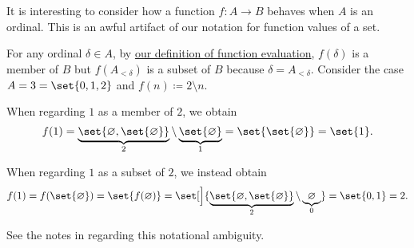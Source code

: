 \begin{remark}\label{rem:function_on_ordinal}
  It is interesting to consider how a function \( f: A \to B \) behaves when \( A \) is an ordinal. This is an awful artifact of our notation for function values of a set.

  For any ordinal \( \delta \in A \), by \hyperref[def:multi_valued_function/set_value]{our definition of function evaluation}, \( f(\delta) \) is a member of \( B \) but \( f(A_{<\delta}) \) is a subset of \( B \) because \( \delta = A_{<\delta} \). Consider the case \( A = 3 = \set{ 0, 1, 2 } \) and \( f(n) \coloneqq 2 \setminus n \).

  When regarding \( 1 \) as a member of \( 2 \), we obtain
  \begin{equation*}
    f(1)
    =
    \underbrace{\set{ \varnothing, \set{ \varnothing } }}_{2} \setminus \underbrace{\set{ \varnothing }}_{1}
    =
    \set{ \set{ \varnothing } }
    =
    \set{ 1 }.
  \end{equation*}

  When regarding \( 1 \) as a subset of \( 2 \), we instead obtain
  \begin{equation*}
    f(1)
    =
    f(\set{ \varnothing })
    =
    \set{ f(\varnothing) }
    =
    \set[\Big]{ \underbrace{\set{ \varnothing, \set{ \varnothing } }}_{2} \setminus \underbrace{ \varnothing }_{0} }
    =
    \set{ 0, 1 }
    =
    2.
  \end{equation*}

  See the notes in  regarding this notational ambiguity.
\end{remark}

